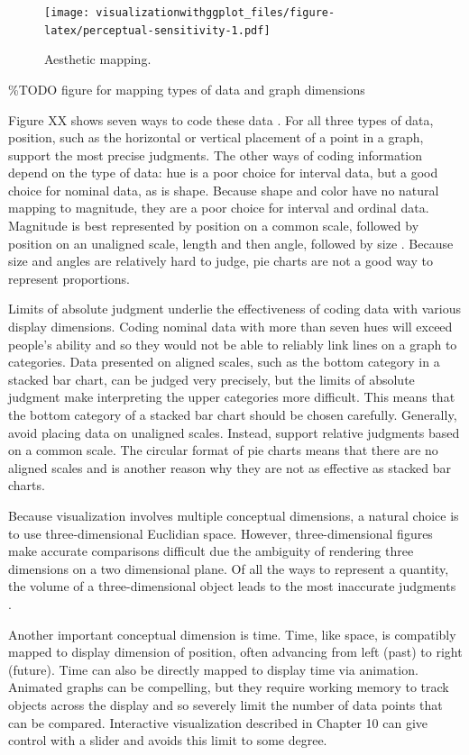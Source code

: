 \documentclass[]{krantz}
\theoremstyle{definition}
\theoremstyle{definition}
\theoremstyle{definition}
\theoremstyle{remark}
\begin{document}
\begin{figure}
\centering
\texttt{[image: visualizationwithggplot\_files/figure-latex/perceptual-sensitivity-1.pdf]}
\caption{\label{fig:perceptual-sensitivity}Aesthetic mapping.}
\end{figure}

\%TODO figure for mapping types of data and graph dimensions
\citep{Cleveland1985}

Figure XX shows seven ways to code these data \citep{Cleveland1985}. For
all three types of data, position, such as the horizontal or vertical
placement of a point in a graph, support the most precise judgments. The
other ways of coding information depend on the type of data: hue is a
poor choice for interval data, but a good choice for nominal data, as is
shape. Because shape and color have no natural mapping to magnitude,
they are a poor choice for interval and ordinal data. Magnitude is best
represented by position on a common scale, followed by position on an
unaligned scale, length and then angle, followed by size
\citep[\citet{Cleveland1985}]{Munzner2014}. Because size and angles are
relatively hard to judge, pie charts are not a good way to represent
proportions.

Limits of absolute judgment underlie the effectiveness of coding data
with various display dimensions. Coding nominal data with more than
seven hues will exceed people's ability and so they would not be able to
reliably link lines on a graph to categories. Data presented on aligned
scales, such as the bottom category in a stacked bar chart, can be
judged very precisely, but the limits of absolute judgment make
interpreting the upper categories more difficult. This means that the
bottom category of a stacked bar chart should be chosen carefully.
Generally, avoid placing data on unaligned scales. Instead, support
relative judgments based on a common scale. The circular format of pie
charts means that there are no aligned scales and is another reason why
they are not as effective as stacked bar charts.

Because visualization involves multiple conceptual dimensions, a natural
choice is to use three-dimensional Euclidian space. However,
three-dimensional figures make accurate comparisons difficult due the
ambiguity of rendering three dimensions on a two dimensional plane. Of
all the ways to represent a quantity, the volume of a three-dimensional
object leads to the most inaccurate judgments \citep{Munzner2014}.

Another important conceptual dimension is time. Time, like space, is
compatibly mapped to display dimension of position, often advancing from
left (past) to right (future). Time can also be directly mapped to
display time via animation. Animated graphs can be compelling, but they
require working memory to track objects across the display and so
severely limit the number of data points that can be compared.
Interactive visualization described in Chapter 10 can give control with
a slider and avoids this limit to some degree.
\end{document}
